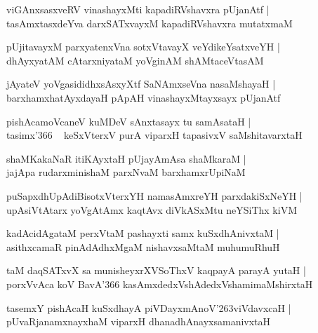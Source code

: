 \documentclass[twoside,12pt,openright]{book}
\def\S{\char'263}
\newcounter{shloka}[chapter]
\begin{document}
\begin{shloka}
viGAnxsasxveRV vinashayxMti kapadiRVshavxra pUjanAtf |\\
tasAmxtasxdeYva darxSATxvayxM kapadiRVshavxra mutatxmaM 
\end{shloka}

\begin{shloka}
pUjitavayxM parxyatenxVna sotxVtavayX veYdikeYsatxveYH |\\
dhAyxyatAM cAtarxniyataM yoVginAM shAMtaceVtasAM 
\end{shloka}

\begin{shloka}
jAyateV yoVgasididhxsAsxyXtf SaNAmxseVna nasaMshayaH |\\
barxhamxhatAyxdayaH pApAH vinashayxMtayxsayx pUjanAtf 
\end{shloka}

\begin{shloka}
pishAcamoVcaneV kuMDeV sAnxtasayx tu samAsataH |\\
tasimx\char'366 ~ keSxVterxV purA viparxH tapasivxV saMshitavarxtaH 
\end{shloka}

\begin{shloka}
shaMKakaNaR itiKAyxtaH pUjayAmAsa shaMkaraM |\\
jajApa rudarxminishaM parxNvaM barxhamxrUpiNaM 
\end{shloka}

\begin{shloka}
puSapxdhUpAdiBisotxVterxYH namasAmxreYH parxdakiSxNeYH |\\
upAsiVtAtarx yoVgAtAmx kaqtAvx diVkASxMtu neYSiThx kiVM 
\end{shloka}

\begin{shloka}
kadAcidAgataM perxVtaM pashayxti samx kuSxdhAnivxtaM |\\
asithxcamaR pinAdAdhxMgaM nishavxsaMtaM muhumuRhuH 
\end{shloka}

\begin{shloka}
taM daqSATxvX sa munisheyxrXVSoThxV  kaqpayA parayA yutaH |\\
porxVvAca koV BavA\char'366 kasAmxdedxVshAdedxVshamimaMshirxtaH 
\end{shloka}

\begin{shloka}
tasemxY pishAcaH kuSxdhayA piVDayxmAnoV\S viVdavxcaH |\\
pUvaRjanamxnayxhaM viparxH dhanadhAnayxsamanivxtaH 
\end{shloka}
\end{document}
